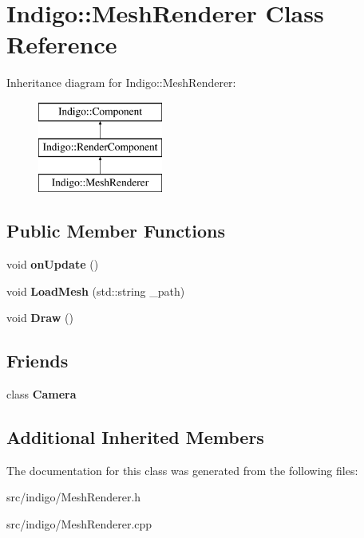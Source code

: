 \hypertarget{class_indigo_1_1_mesh_renderer}{}\section{Indigo\+:\+:Mesh\+Renderer Class Reference}
\label{class_indigo_1_1_mesh_renderer}
Inheritance diagram for Indigo\+:\+:Mesh\+Renderer\+:\begin{figure}[H]
\begin{center}
\leavevmode
\includegraphics[height=3.000000cm]{class_indigo_1_1_mesh_renderer}
\end{center}
\end{figure}
\subsection*{Public Member Functions}
\begin{DoxyCompactItemize}
\item 
\mbox{\label{class_indigo_1_1_mesh_renderer_a1fcff2c7f75ab1fd629d0859863e5ba5}} 
void {\bfseries on\+Update} ()
\item 
\mbox{\label{class_indigo_1_1_mesh_renderer_a42321ee7644cfaeee02b5ba2175b2740}} 
void {\bfseries Load\+Mesh} (std\+::string \+\_\+path)
\item 
\mbox{\label{class_indigo_1_1_mesh_renderer_a4d7927158b19fce2d5cbb7ef1124e994}} 
void {\bfseries Draw} ()
\end{DoxyCompactItemize}
\subsection*{Friends}
\begin{DoxyCompactItemize}
\item 
\mbox{\label{class_indigo_1_1_mesh_renderer_ad8bd9afbbd7af19d996da80e9d25890d}} 
class {\bfseries Camera}
\end{DoxyCompactItemize}
\subsection*{Additional Inherited Members}


The documentation for this class was generated from the following files\+:\begin{DoxyCompactItemize}
\item 
src/indigo/Mesh\+Renderer.\+h\item 
src/indigo/Mesh\+Renderer.\+cpp\end{DoxyCompactItemize}
